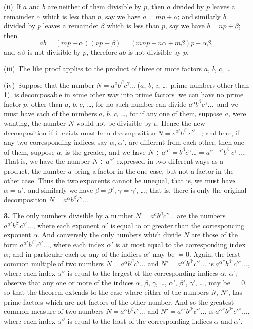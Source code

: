 \documentclass[11pt,a4paper]{article}
\begin{document}
(ii)~If $a$ and $b$ are neither of them divisible by $p$, then $a$ divided by $p$ leaves a remainder $\alpha$ which is less than $p$, say we have $a = mp + \alpha$; and similarly $b$ divided by $p$ leaves a remainder $\beta$ which is less than $p$, say we have $b = np + \beta$; then
\[
ab = (mp + \alpha)(np + \beta) = (mnp + n\alpha + m\beta)p + \alpha\beta,
\]
and $\alpha\beta$ is not divisible by $p$, therefore $ab$ is not divisible by $p$.

(iii)~The like proof applies to the product of three or more factors $a$, $b$, $c$, \ldots

(iv)~Suppose that the number $N = a^{\alpha} b^{\beta} c^{\gamma} \ldots$ ($a$, $b$, $c$, \ldots\ prime numbers other than 1), is decomposable in some other way into prime factors; we can have no prime factor $p$, other than $a$, $b$, $c$, \ldots, for no such number can divide $a^{\alpha} b^{\beta} c^{\gamma} \ldots$; and we must have each of the numbers $a$, $b$, $c$, \ldots, for if any one of them, suppose $a$, were wanting, the number $N$ would not be divisible by $a$. Hence the new decomposition if it exists must be a decomposition $N = a^{\alpha'} b^{\beta'} c^{\gamma'} \ldots$; and here, if any two corresponding indices, say $\alpha$, $\alpha'$, are different from each other, then one of them, suppose $\alpha$, is the greater, and we have $N \div a^{\alpha'} = b^{\beta} c^{\gamma} \ldots = a^{\alpha - \alpha'} b^{\beta'} c^{\gamma'} \ldots$. That is, we have the number $N \div a^{\alpha'}$ expressed in two different ways as a product, the number $a$ being a factor in the one case, but not a factor in the other case. Thus the two exponents cannot be unequal, that is, we must have $\alpha = \alpha'$, and similarly we have $\beta = \beta'$, $\gamma = \gamma'$, \ldots; that is, there is only the original decomposition $N = a^{\alpha} b^{\beta} c^{\gamma} \ldots$.


\textbf{3.}\quad
The only numbers divisible by a number $N = a^{\alpha} b^{\beta} c^{\gamma} \ldots$ are the numbers $a^{\alpha'} b^{\beta'} c^{\gamma'} \ldots$, where each exponent $\alpha'$ is equal to or greater than the corresponding exponent $\alpha$. And conversely the only numbers which divide $N$ are those of the form $a^{\alpha'} b^{\beta'} c^{\gamma'} \ldots$, where each index $\alpha'$ is at most equal to the corresponding index $\alpha$; and in particular each or any of the indices $\alpha'$ may be $= 0$. Again, the least common multiple of two numbers $N = a^{\alpha} b^{\beta} c^{\gamma} \ldots$ and $N' = a^{\alpha'} b^{\beta'} c^{\gamma'} \ldots$ is $a^{\alpha''} b^{\beta''} c^{\gamma''} \ldots$, where each index $\alpha''$ is equal to the largest of the corresponding indices $\alpha$, $\alpha'$;---observe that any one or more of the indices $\alpha$, $\beta$, $\gamma$, \ldots, $\alpha'$, $\beta'$, $\gamma'$, \ldots, may be $= 0$, so that the theorem extends to the case where either of the numbers $N$, $N'$, has prime factors which are not factors of the other number. And so the greatest common measure of two numbers $N = a^{\alpha} b^{\beta} c^{\gamma} \ldots$ and $N' = a^{\alpha'} b^{\beta'} c^{\gamma'} \ldots$ is $a^{\alpha''} b^{\beta''} c^{\gamma''} \ldots$, where each index $\alpha''$ is equal to the least of the corresponding indices $\alpha$ and $\alpha'$.
\end{document}
